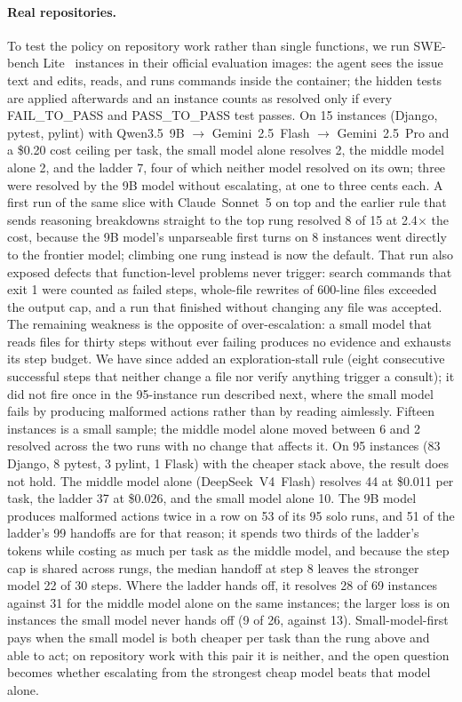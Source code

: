 \paragraph{Real repositories.}
To test the policy on repository work rather than single functions, we run SWE-bench Lite~\cite{jimenez2024swebench} instances in their official evaluation images: the agent sees the issue text and edits, reads, and runs commands inside the container; the hidden tests are applied afterwards and an instance counts as resolved only if every FAIL\_TO\_PASS and PASS\_TO\_PASS test passes.
On 15 instances (Django, pytest, pylint) with Qwen3.5~9B $\rightarrow$ Gemini~2.5~Flash $\rightarrow$ Gemini~2.5~Pro and a \$0.20 cost ceiling per task, the small model alone resolves 2, the middle model alone 2, and the ladder 7, four of which neither model resolved on its own; three were resolved by the 9B model without escalating, at one to three cents each.
A first run of the same slice with Claude~Sonnet~5 on top and the earlier rule that sends reasoning breakdowns straight to the top rung resolved 8 of 15 at 2.4$\times$ the cost, because the 9B model's unparseable first turns on 8 instances went directly to the frontier model; climbing one rung instead is now the default.
That run also exposed defects that function-level problems never trigger: search commands that exit 1 were counted as failed steps, whole-file rewrites of 600-line files exceeded the output cap, and a run that finished without changing any file was accepted.
The remaining weakness is the opposite of over-escalation: a small model that reads files for thirty steps without ever failing produces no evidence and exhausts its step budget.
We have since added an exploration-stall rule (eight consecutive successful steps that neither change a file nor verify anything trigger a consult); it did not fire once in the 95-instance run described next, where the small model fails by producing malformed actions rather than by reading aimlessly.
Fifteen instances is a small sample; the middle model alone moved between 6 and 2 resolved across the two runs with no change that affects it.
On 95 instances (83 Django, 8 pytest, 3 pylint, 1 Flask) with the cheaper stack above, the result does not hold.
The middle model alone (DeepSeek~V4~Flash) resolves 44 at \$0.011 per task, the ladder 37 at \$0.026, and the small model alone 10.
The 9B model produces malformed actions twice in a row on 53 of its 95 solo runs, and 51 of the ladder's 99 handoffs are for that reason; it spends two thirds of the ladder's tokens while costing as much per task as the middle model, and because the step cap is shared across rungs, the median handoff at step 8 leaves the stronger model 22 of 30 steps.
Where the ladder hands off, it resolves 28 of 69 instances against 31 for the middle model alone on the same instances; the larger loss is on instances the small model never hands off (9 of 26, against 13).
Small-model-first pays when the small model is both cheaper per task than the rung above and able to act; on repository work with this pair it is neither, and the open question becomes whether escalating from the strongest cheap model beats that model alone.

